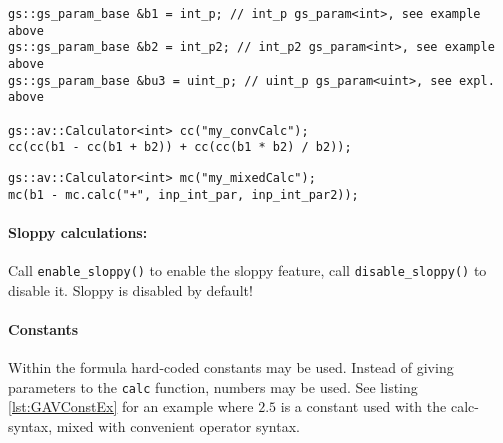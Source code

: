 \noindent
\begin{minipage}{\textwidth}
\begin{lstlisting}[caption={
	Example using convenient operators: \newline 
	Calculator type: {\sffamily int}, formula: $(b1 - (b1+b2)) + ((b1*b2) / b2)$.
	}, label=lst:GAVConvOpEx]
gs::gs_param_base &b1 = int_p; // int_p gs_param<int>, see example above
gs::gs_param_base &b2 = int_p2; // int_p2 gs_param<int>, see example above
gs::gs_param_base &bu3 = uint_p; // uint_p gs_param<uint>, see expl. above

gs::av::Calculator<int> cc("my_convCalc");
cc(cc(b1 - cc(b1 + b2)) + cc(cc(b1 * b2) / b2));
\end{lstlisting}
\end{minipage}

\noindent
\begin{minipage}{\textwidth}
\begin{lstlisting}[caption={
	Example mixing calc-syntax and convenient operators: \newline 
	Calculator type: {\sffamily int}, formula: $(b1 - (inp\_int\_par + inp\_int\_par2))$.
	}, label=lst:GAVMixedOpEx]
gs::av::Calculator<int> mc("my_mixedCalc");
mc(b1 - mc.calc("+", inp_int_par, inp_int_par2));
\end{lstlisting}
\end{minipage}


\paragraph{Sloppy calculations:} Call \lstinline|enable_sloppy()| to enable the sloppy feature, call \lstinline|disable_sloppy()| to disable it. Sloppy is disabled by default!

\paragraph{Constants}
Within the formula hard-coded constants may be used. Instead of giving parameters to the \lstinline|calc| function, numbers may be used. See listing \ref{lst:GAVConstEx} for an example where $2.5$ is a constant used with the calc-syntax, mixed with convenient operator syntax.

